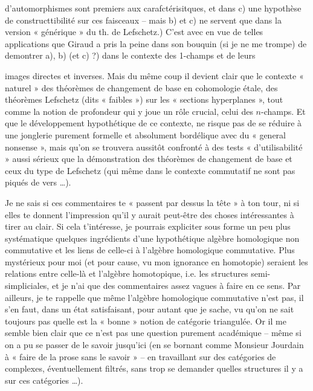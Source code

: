 \documentclass[11pt,a4paper]{article}
\begin{document}
d'automorphismes sont premiers aux carafctérisitques, et dans c) une hypothèse de constructtibilité sur ces faisceaux -- mais b) et c) ne servent que dans la version « générique » du th. de Lefschetz.) C'est avec en vue de telles applications que Giraud a pris la peine dans son bouquin (si je ne me trompe) de demontrer a), b) (et c) ?) dans le contexte des 1-champs et de leurs

images directes et inverses. Mais du même coup il devient clair que le contexte « naturel » des théorèmes de changement de base en cohomologie étale, des théorèmes   Lefschetz (dits « faibles ») sur les « sections hyperplanes », tout comme  la notion de profondeur qui y joue un rôle crucial,  celui des $n$-champs. Et que le développement hypothétique de ce contexte, ne risque pas de se réduire à une jonglerie purement formelle et absolument bordélique avec du « general nonsense », mais qu'on se trouvera aussitôt confronté à des tests « d'utilisabilité » aussi sérieux que la démonstration des théorèmes de changement de base et ceux du type de Lefschetz (qui même dans le contexte commutatif ne sont pas piqués de vers …). 

Je ne sais si ces commentaires te « passent par dessus la tête » à ton tour, ni si elles te donnent l'impression qu'il y aurait peut-être des choses intéressantes à tirer au clair. Si cela t'intéresse, je pourrais expliciter sous forme un peu plus systématique quelques ingrédients d'une hypothétique algèbre homologique non commutative et les liens de celle-ci à l'algèbre homologique commutative. Plus mystérieux pour moi (et pour cause, vu mon ignorance en homotopie) seraient les relations entre celle-là et l'algèbre homotopique, i.e. les structures semi-simpliciales, et je n'ai que des commentaires assez vagues à faire en ce sens\add{(*)}. Par ailleurs, je te rappelle que même l'algèbre homologique commutative n'est pas, il s'en faut, dans un état satisfaisant, pour autant que je sache, vu qu'on ne sait toujours pas quelle est la « bonne » notion de catégorie triangulée. Or il me semble bien clair que ce n'est pas une question purement académique -- même si on a pu se passer de le savoir jusqu'ici (en se bornant comme Monsieur Jourdain à « faire de la prose sans le savoir » -- en travaillant sur des catégories de complexes, éventuellement filtrés, sans trop se demander quelles structures il y a sur ces catégories …).
\end{document}
